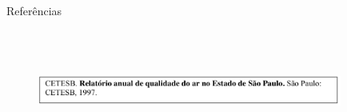 \begin{frame}	
	\begin{block}{Referências}	
		 \begin{figure}[!htb]
			\centering	  				
			\includegraphics[height=4cm, width = 10cm]{./pic/referencias/relatoriooficial.png}
			\author{Guia de formatação SENAC }
			\label{fig_referencia06}
		\end{figure}
	\end{block}
\end{frame}
